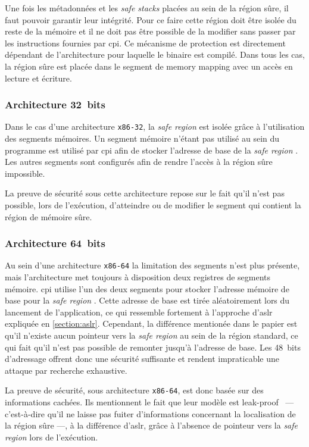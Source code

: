 Une fois les métadonnées et les \og \textit{safe stacks} \fg placées au sein de la région sûre, il faut pouvoir garantir leur intégrité. Pour ce faire cette région doit être isolée du reste de la mémoire et il ne doit pas être possible de la modifier sans passer par les instructions fournies par \gls{cpi}. Ce mécanisme de protection est directement dépendant de l'architecture pour laquelle le binaire est compilé. Dans tous les cas, la région sûre est placée dans le segment de \og memory mapping \fg avec un accès en lecture et écriture.

\subsubsection{Architecture 32~bits}

Dans le cas d'une architecture \texttt{x86-32}, la \og \textit{safe region} \fg est isolée grâce à l'utilisation des segments mémoires. Un segment mémoire n'étant pas utilisé au sein du programme est utilisé par \gls{cpi} afin de stocker l'adresse de base de la \og \textit{safe region} \fg. Les autres segments sont configurés afin de rendre l'accès à la région sûre impossible.

La preuve de sécurité sous cette architecture repose sur le fait qu'il n'est pas possible, lors de l'exécution, d'atteindre ou de modifier le segment qui contient la région de mémoire sûre.

\subsubsection{Architecture 64~bits}

Au sein d'une architecture \texttt{x86-64} la limitation des segments n'est plus présente, mais l'architecture met toujours à disposition deux registres de segments mémoire. \gls{cpi} utilise l'un des deux segments pour stocker l'adresse mémoire de base pour la \og \textit{safe region} \fg. Cette adresse de base est tirée aléatoirement lors du lancement de l'application, ce qui ressemble fortement à l'approche d'\gls{aslr} expliquée en \autoref{section:aslr}. Cependant, la différence mentionée dans le papier est qu'il n'existe aucun pointeur vers la \og \textit{safe region} \fg au sein de la région standard, ce qui fait qu'il n'est pas possible de remonter jusqu'à l'adresse de base. Les 48~bits d'adressage offrent donc une sécurité suffisante et rendent impraticable une attaque par recherche exhaustive.

La preuve de sécurité, sous architecture \texttt{x86-64}, est donc basée sur des informations cachées. Ils mentionnent le fait que leur modèle est \og leak-proof \fg \ --- c’est-à-dire qu'il ne laisse pas fuiter d'informations concernant la localisation de la région sûre ---, à la différence d'\gls{aslr}, grâce à l'absence de pointeur vers la \og \textit{safe region} \fg lors de l'exécution.



